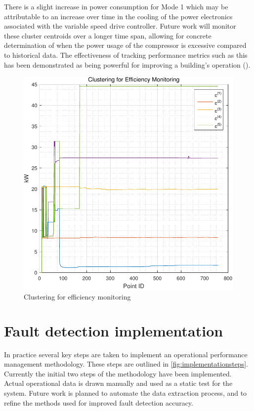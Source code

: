 There is a slight increase in power consumption for Mode 1 which may be attributable to an increase over time in the cooling of the power electronics associated with the variable speed drive controller. Future work will monitor these cluster centroids over a longer time span, allowing for concrete determination of when the power usage of the compressor is excessive compared to historical data. The effectiveness of tracking performance metrics such as this has been demonstrated as being powerful for improving a building's operation (\cite{OSullivan2004}).

\begin{figure}
\includegraphics[width = .5\columnwidth]{./Images/EfficiencyDegradation.pdf}
\caption{Clustering for efficiency monitoring}
\label{fig:efficiencymonitoring}
\end{figure}

\section{Fault detection implementation}
\label{sec:results}

In practice several key steps are taken to implement an operational performance management methodology. These steps are outlined in \autoref{fig:implementationsteps}. Currently the initial two steps of the methodology have been implemented. Actual operational data is drawn manually and used as a static test for the system. Future work is planned to automate the data extraction process, and to refine the methods used for improved fault detection accuracy.

